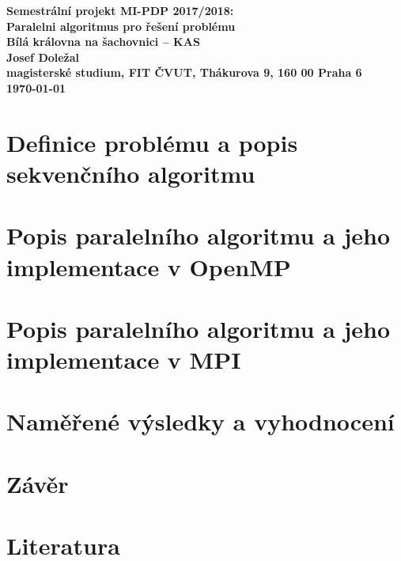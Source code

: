 \documentclass[czech]{article}
\begin{document}
\begin{center}\large
\bf Semestrální projekt MI-PDP 2017/2018:\\[6mm]
    Paralelni algoritmus pro řešení problému\\[3mm]
    Bílá královna na šachovnici -- KAS\\[6mm]
    Josef Doležal\\[2mm]
    magisterské studium, FIT ČVUT, Thákurova 9, 160 00 Praha 6\\[2mm]
    \today
\end{center}

\thispagestyle{empty}
\newpage

\section{Definice problému a popis sekvenčního algoritmu}

\section{Popis paralelního algoritmu a jeho implementace v OpenMP}

\section{Popis paralelního algoritmu a jeho implementace v MPI}

\section{Naměřené výsledky a vyhodnocení}

\section{Závěr}

\section{Literatura}

\appendix
\end{document}
